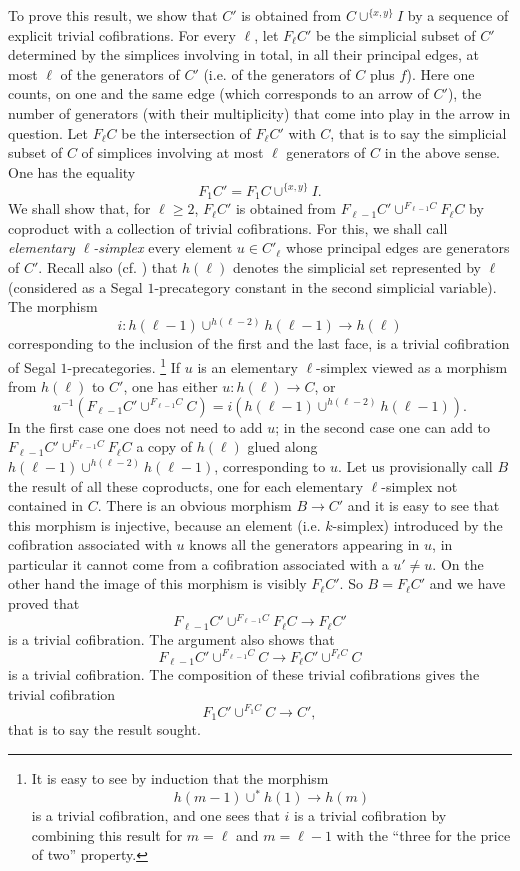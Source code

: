 To prove this result, we show that $C'$
is obtained from $C\cup ^{\{ x,y\} } I$ by a sequence of explicit
trivial cofibrations. For every $\ell$, let $F_{\ell}C'$ be the simplicial
subset of $C'$ determined by the simplices involving in total, in all
their
principal edges, at most $\ell$ of the generators of $C'$ (i.e. of the
generators of $C$ plus $f$). Here one counts, on one and the same edge (which
corresponds to an arrow of $C'$), the number of generators (with
their multiplicity) that come into play in the arrow in question. Let
$F_{\ell}C$ be the intersection of $F_{\ell}C'$ with $C$, that is to say the
simplicial subset of $C$ of simplices involving at most
$\ell$ generators of $C$ in the above sense. One has the equality
$$
F_1C' = F_1C \cup ^{\{ x,y\} } I.
$$
We shall show that, for $\ell \geq 2$, $F_{\ell}C'$ is obtained
from $F_{\ell -1}C'\cup ^{F_{\ell -1}C}F_{\ell}C$ by coproduct with a
collection of trivial cofibrations. For this, we shall call {\em
elementary $\ell$-simplex} every element $u\in C'_{\ell}$ whose principal
edges are generators of $C'$. Recall also (cf.
\cite{nCAT}) that $h(\ell )$ denotes the simplicial set represented
by $\ell$
(considered as a Segal $1$-precategory constant in the second simplicial
variable).
The morphism
$$
i: h(\ell -1) \cup ^{h(\ell -2)}h(\ell -1)\rightarrow h(\ell )
$$
corresponding to the inclusion of the first and the last face, is a
trivial cofibration of Segal $1$-precategories.
\footnote{
It is easy to see by induction that the morphism
$$
h(m -1) \cup ^{\ast} h(1) \rightarrow h(m )
$$
is a trivial cofibration, and one sees that $i$ is a trivial cofibration
by combining this result for $m=\ell$ and $m=\ell -1$
with the ``three for the price of two'' property.}
If $u$ is an elementary $\ell$-simplex viewed as a
morphism
from $h(\ell )$ to $C'$, one has either $u: h(\ell )\rightarrow C$, or
$$
u^{-1} (F_{\ell -1}C' \cup ^{F_{\ell -1}C} C) =
i\left( h(\ell -1) \cup ^{h(\ell -2)}h(\ell -1)\right) .
$$
In the first case one does not need to add $u$; in the second case one
can add to $F_{\ell -1} C'\cup ^{F_{\ell -1}C} F_{\ell}C$ a copy of
$h(\ell )$ glued along $ h(\ell -1) \cup ^{h(\ell -2)}h(\ell -1)$,
corresponding to $u$. Let us provisionally call $B$ the result of all these
coproducts, one for each elementary $\ell$-simplex not contained
in $C$. There is an obvious morphism $B\rightarrow C'$ and it is easy
to see
that this morphism is injective, because an element (i.e. $k$-simplex)
introduced
by the cofibration associated with $u$ knows all the generators
appearing
in $u$, in particular it cannot come from a
cofibration associated with a $u'\neq u$. On the other hand the image of this
morphism is
visibly $F_{\ell} C'$. So $B=F_{\ell} C'$ and we have proved that
$$
F_{\ell -1} C'\cup ^{F_{\ell -1}C} F_{\ell}C\rightarrow
F_{\ell} C'
$$
is a trivial cofibration. The argument also shows that
$$
F_{\ell -1} C'\cup ^{F_{\ell -1}C} C\rightarrow
F_{\ell } C'\cup ^{F_{\ell }C} C
$$
is a trivial cofibration. The composition of these
trivial cofibrations gives the trivial cofibration
$$
F_1C'\cup ^{F_1C} C\rightarrow C',
$$
that is to say the result sought.


